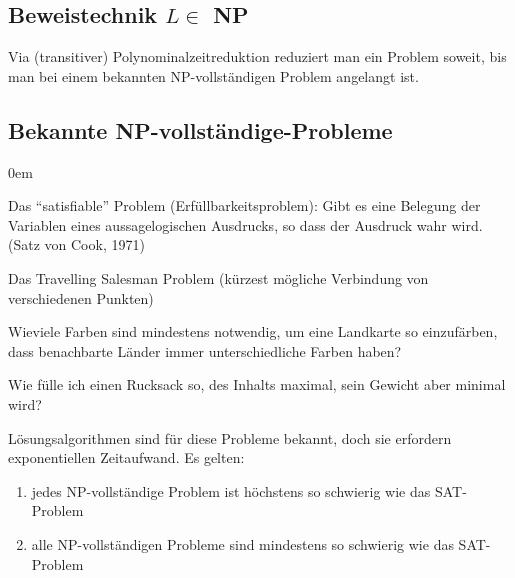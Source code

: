 \subsection{Beweistechnik $L \in$ NP}
Via (transitiver) Polynominalzeitreduktion reduziert man ein Problem soweit, bis man bei einem bekannten NP-vollständigen Problem angelangt ist.

\subsection{Bekannte NP-vollständige-Probleme}
\begin{description}\itemsep0em
	\item [SAT]
	Das \enquote{satisfiable} Problem (Erfüllbarkeitsproblem): Gibt es eine Belegung der Variablen eines aussagelogischen Ausdrucks, so dass der Ausdruck wahr wird. (Satz von Cook, 1971)
	\item [TST]
	Das Travelling Salesman Problem (kürzest mögliche Verbindung von verschiedenen Punkten)
	\item [\enquote{Färbungsproblem}] 
	Wieviele Farben sind mindestens notwendig, um eine Landkarte so einzufärben, dass benachbarte Länder immer unterschiedliche Farben haben?
	\item [\enquote{Rucksack}-Problem] Wie fülle ich einen Rucksack so, des Inhalts maximal, sein Gewicht aber minimal wird?
\end{description}

Lösungsalgorithmen sind für diese Probleme bekannt, doch sie erfordern exponentiellen Zeitaufwand. Es gelten: 
\begin{enumerate}\itemsep0em
	\item jedes NP-vollständige Problem ist höchstens so schwierig wie das SAT-Problem
	\item alle NP-vollständigen Probleme sind mindestens so schwierig wie das SAT-Problem
\end{enumerate}

